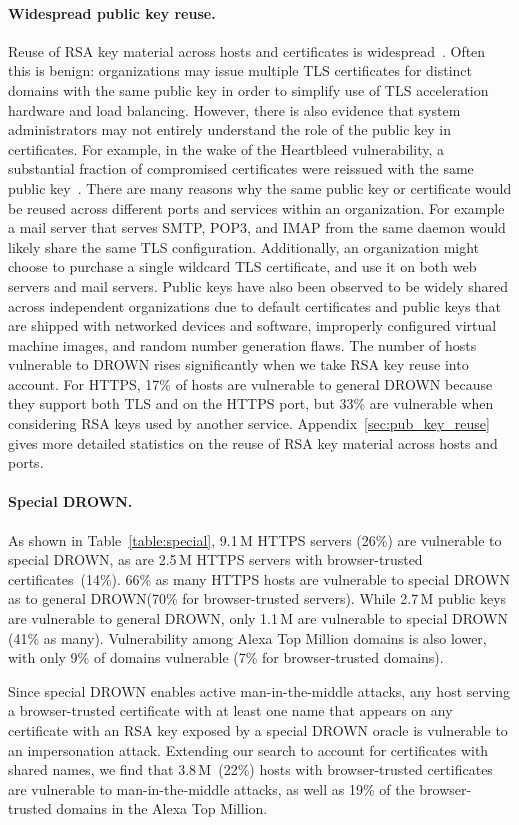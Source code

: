 \paragraph{Widespread public key reuse.}
Reuse of RSA key material across hosts and certificates is widespread~\cite{2016holz_analysis_tls-based_protocols_electronic_communication,weak-keys-2012}.
Often this is benign: organizations may issue multiple TLS certificates for
distinct domains with the same public key in order to
simplify use of TLS acceleration hardware and load balancing.
However, there is also evidence that system administrators may not entirely
understand the role of the public key in certificates. For example, in the wake
of the Heartbleed vulnerability, a substantial fraction of compromised
certificates were reissued with the same public
key~\cite{Durumeric:2014:MH:2663716.2663755}.  
\ifext
There are many reasons why the same public key or certificate would be reused
across different ports and services within an organization. For example a mail
server that serves SMTP, POP3, and IMAP from the same daemon would likely share
the same TLS configuration.  Additionally, an organization might choose to
purchase a single wildcard TLS certificate, and use it on both web servers and
mail servers. Public keys have also been observed to be widely shared across
independent organizations due to default certificates and public keys that are
shipped with networked devices and software, improperly configured virtual
machine images, and random number generation flaws.
\fi
The number of hosts vulnerable to DROWN rises significantly when we take RSA
key reuse into account. For HTTPS, 17\% of hosts are vulnerable to general
DROWN because they support both TLS and \ssltwo on the HTTPS port, but 33\% are vulnerable when considering RSA keys used by
another service.
\ifext Appendix~\ref{sec:pub_key_reuse}
gives more detailed statistics on the reuse of RSA key material across hosts
and ports. \fi

\paragraph{Special DROWN\@.}
As shown in Table~\ref{table:special},
9.1\,M HTTPS servers (26\%) are
vulnerable to special DROWN, as are 2.5\,M HTTPS servers with browser-trusted
certificates~(14\%). 66\% as many HTTPS hosts are vulnerable to special DROWN
as to general DROWN\@ (70\% for browser-trusted servers). While 2.7\,M public
keys are vulnerable to general DROWN, only 1.1\,M are vulnerable to special DROWN
(41\% as many). Vulnerability among Alexa Top Million domains is also lower, with
only 9\% of domains vulnerable (7\% for browser-trusted domains).

Since special DROWN enables active man-in-the-middle attacks, any host serving
a browser-trusted certificate with at least one name that appears on any
certificate with an RSA key exposed by a special DROWN oracle is vulnerable to an
impersonation attack. Extending our search to account for certificates with
shared names, we find that 3.8\,M~(22\%) hosts with browser-trusted certificates
are vulnerable to man-in-the-middle attacks, as well as 19\% of the
browser-trusted domains in the Alexa Top Million.
